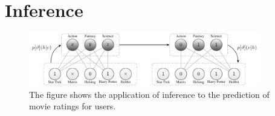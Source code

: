 \documentclass[crop=false,10pt]{standalone}
\begin{document}
  \section{Inference} %
  \label{sec:Inference}
    \begin{figure}
      \center
      \includegraphics[width=0.9\textwidth]{figures/rbm-inference-example.pdf}
      \caption{%
        The figure shows the application of inference to the prediction of movie ratings for users.
      }
      \label{fig:rbm-inference-example}
    \end{figure}
\end{document}
